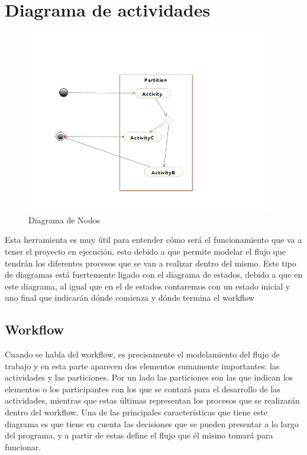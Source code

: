 \chapter{Diagrama de actividades}

\begin{figure}[h!]
	\centering
	\includegraphics[scale=0.5]{diseno/actividades/img/actividades}
	\caption{Diagrama de Nodos}
\end{figure}

Esta herramienta es muy útil para entender cómo será el funcionamiento que va a tener el proyecto en ejecución, esto debido a que permite modelar el flujo que tendrán los diferentes procesos que se van a realizar dentro del mismo.
Este tipo de diagramas está fuertemente ligado con el diagrama de estados, debido a que en este diagrama, al igual que en el de estados contaremos con un estado inicial y uno final que indicarán dónde comienza y dónde termina el workflow

\section{Workflow}
Cuando se habla del workflow, es precisamente el modelamiento del flujo de trabajo y en esta parte aparecen dos elementos sumamente importantes: las actividades y las particiones.
Por un lado las particiones son las que indican los elementos o los participantes con los que se contará para el desarrollo de las actividades, mientras que estas últimas representan los procesos que se realizarán dentro del workflow.
Una de las principales características que tiene este diagrama es que tiene en cuenta las decisiones que se pueden presentar a lo largo del programa, y a partir de estas define el flujo que él mismo tomará para funcionar.

